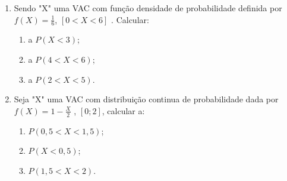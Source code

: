 \begin{enumerate}[resume]
\item Sendo "X" uma VAC com função densidade de probabilidade definida por $f(X) = \frac{1}{6}$, $[0 < X < 6]$ . Calcular:
	\begin{enumerate}
	\item a $P(X < 3)$;
	\item  a $P(4 < X < 6)$;
	\item a $P(2 < X < 5)$.
	\end{enumerate}

\item Seja "X" uma VAC com distribuição continua de probabilidade dada por $f(X) = 1 - \frac{X}{2} $ , $[0 ; 2]$, calcular a:
	\begin{enumerate}
	\item $P(0,5 < X < 1,5)$;
	\item $P(X < 0,5)$;
	\item	$P(1,5 < X < 2)$.
	\end{enumerate}
\end{enumerate}